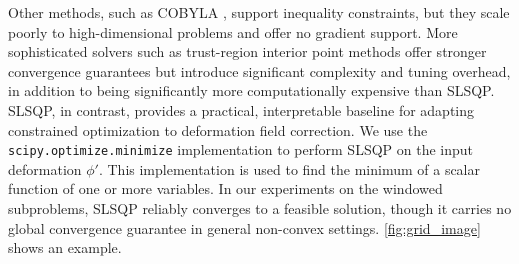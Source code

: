 Other methods, such as COBYLA \cite{Powell1994}, support inequality constraints, but they scale poorly to high-dimensional problems and offer no gradient support. More sophisticated solvers such as trust-region interior point methods \cite{Byrd2000} offer stronger convergence guarantees but introduce significant complexity and tuning overhead, in addition to being significantly more computationally expensive than SLSQP. SLSQP, in contrast, provides a practical, interpretable baseline for adapting constrained optimization to deformation field correction. We use the \texttt{scipy.optimize.minimize} implementation \cite{SciPySLSQPDoc} to perform SLSQP on the input deformation $\phi'$. This implementation is used to find the minimum of a scalar function of one or more variables. In our experiments on the windowed subproblems, SLSQP reliably converges to a feasible solution, though it carries no global convergence guarantee in general non-convex settings. \autoref{fig:grid_image} shows an example.

